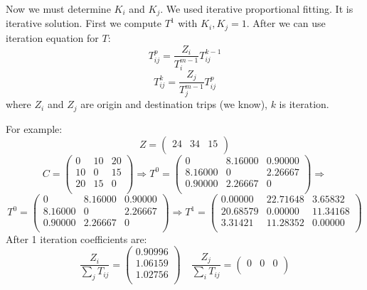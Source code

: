 Now we must determine $K_i$ and $K_j$. We used iterative proportional fitting. It is iterative solution. First we compute $T^1$ with $K_i, K_j = 1$. After we can use iteration equation for $T$:
$$T_{ij}^{p} = \frac{Z_i}{T_i^{m-1}} T_{ij}^{k-1}$$
$$T_{ij}^{k} = \frac{Z_j}{T_j^{m-1}} T_{ij}^{p}$$
where $Z_i$ and $Z_j$ are origin and destination trips (we know), $k$ is iteration.

For example:
$$Z = (\begin{array}{ccc}
24  & 34  & 15\\
\end{array})$$
$$
C = \left(\begin{array}{ccc}
0& 10 &20 \\
10& 0 &15 \\
20 & 15& 0 \\
\end{array}\right) \Rightarrow T^0 = \left(\begin{array}{ccc}
       0  & 8.16000  &  0.90000\\
   8.16000  &     0  & 2.26667\\
   0.90000  & 2.26667  &    0\\
\end{array}\right) \Rightarrow$$
$$T^0 = \left(\begin{array}{ccc}
       0  & 8.16000  &  0.90000\\
   8.16000  &     0  & 2.26667\\
   0.90000  & 2.26667  &    0\\
\end{array}\right) \Rightarrow T^1 = \left( \begin{array}{ccc}
    0.00000 &  22.71648 &   3.65832 \\
   20.68579 &   0.00000 &  11.34168 \\
    3.31421 &  11.28352 &   0.00000 \\
\end{array} \right)$$
After 1 iteration coefficients are:
$$\frac{Z_i}{\sum_j T_{ij}} = \left(\begin{array}{c}
0.90996 \\
1.06159  \\
1.02756\\
\end{array}\right) \quad \frac{Z_j}{\sum_i T_{ij}} = \left(\begin{array}{ccc}
0  & 0 & 0\\
\end{array}\right)$$


